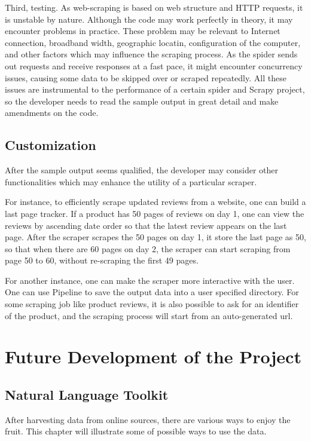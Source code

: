 \documentclass[12pt]{report}
\begin{document}
Third, testing. As web-scraping is based on web structure and HTTP requests, it is unstable by nature. Although the code may work perfectly in theory, it may encounter problems in practice. These problem may be relevant to Internet connection, broadband width, geographic locatin, configuration of the computer, and other factors which may influence the scraping process. As the spider sends out requests and receive responses at a fast pace, it might encounter concurrency issues, causing some data to be skipped over or scraped repeatedly. All these issues are instrumental to the performance of a certain spider and Scrapy project, so the developer needs to read the sample output in great detail and make amendments on the code.

\section{Customization}

After the sample output seems qualified, the developer may consider other functionalities which may enhance the utility of a particular scraper. 

For instance, to efficiently scrape updated reviews from a website, one can build a last page tracker. If a product has 50 pages of reviews on day 1, one can view the reviews by ascending date order so that the latest review appears on the last page. After the scraper scrapes the 50 pages on day 1, it store the last page as 50, so that when there are 60 pages on day 2, the scraper can start scraping from page 50 to 60, without re-scraping the first 49 pages.

For another instance, one can make the scraper more interactive with the user. One can use Pipeline to save the output data into a user specified directory. For some scraping job like product reviews, it is also possible to ask for an identifier of the product, and the scraping process will start from an auto-generated url.

\chapter{Future Development of the Project}


\section{Natural Language Toolkit}
After harvesting data from online sources, there are various ways to enjoy the fruit. This chapter will illustrate some of possible ways to use the data.
\end{document}
